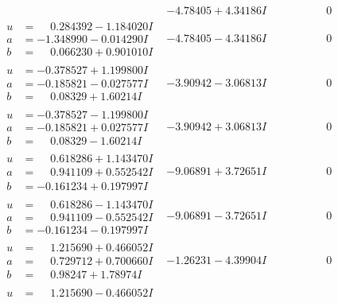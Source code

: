 \documentclass[1p]{elsarticle_modified}
\theoremstyle{definition}
\begin{document}
$$\begin{array}{c|c|c}
 & -4.78405 + 4.34186 I & \phantom{-0.000000 } 0 \\ \hline\begin{aligned}
u &= \phantom{-}0.284392 - 1.184020 I \\
a &= -1.348990 - 0.014290 I \\
b &= \phantom{-}0.066230 + 0.901010 I\end{aligned}
 & -4.78405 - 4.34186 I & \phantom{-0.000000 } 0 \\ \hline\begin{aligned}
u &= -0.378527 + 1.199800 I \\
a &= -0.185821 - 0.027577 I \\
b &= \phantom{-}0.08329 + 1.60214 I\end{aligned}
 & -3.90942 - 3.06813 I & \phantom{-0.000000 } 0 \\ \hline\begin{aligned}
u &= -0.378527 - 1.199800 I \\
a &= -0.185821 + 0.027577 I \\
b &= \phantom{-}0.08329 - 1.60214 I\end{aligned}
 & -3.90942 + 3.06813 I & \phantom{-0.000000 } 0 \\ \hline\begin{aligned}
u &= \phantom{-}0.618286 + 1.143470 I \\
a &= \phantom{-}0.941109 + 0.552542 I \\
b &= -0.161234 + 0.197997 I\end{aligned}
 & -9.06891 + 3.72651 I & \phantom{-0.000000 } 0 \\ \hline\begin{aligned}
u &= \phantom{-}0.618286 - 1.143470 I \\
a &= \phantom{-}0.941109 - 0.552542 I \\
b &= -0.161234 - 0.197997 I\end{aligned}
 & -9.06891 - 3.72651 I & \phantom{-0.000000 } 0 \\ \hline\begin{aligned}
u &= \phantom{-}1.215690 + 0.466052 I \\
a &= \phantom{-}0.729712 + 0.700660 I \\
b &= \phantom{-}0.98247 + 1.78974 I\end{aligned}
 & -1.26231 - 4.39904 I & \phantom{-0.000000 } 0 \\ \hline\begin{aligned}
u &= \phantom{-}1.215690 - 0.466052 I \\

\end{aligned}
\end{array}$$
\end{document}
